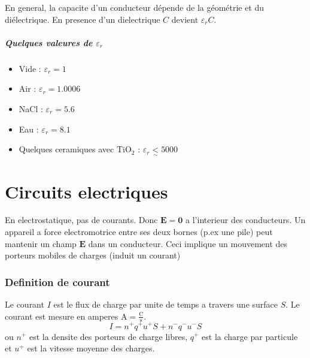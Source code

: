 En general, la capacite d'un conducteur dépende de la géométrie et du diélectrique.  En presence d'un dielectrique $C$ devient $\varepsilon _{r}C$.

\paragraph{Quelques valeures de $\varepsilon _{r}$}
\begin{itemize}
\item Vide : $\varepsilon _{r}=1$
\item Air : $\varepsilon _{r}=1.0006$
\item NaCl : $\varepsilon _{r}=5.6$
\item Eau : $\varepsilon _{r}=8.1$
\item Quelques ceramiques avec $\mathrm{TiO}_{2}$ : $\varepsilon _{r} \underset{\sim}< 5000$
\end{itemize}

\chapter{Circuits electriques}

En electrostatique, pas de courants. Donc $\boldsymbol{E}=\boldsymbol{0}$ a l'interieur des conducteurs. Un appareil a force electromotrice entre ses deux bornes (p.ex une pile) peut mantenir un champ $\boldsymbol{E}$ dans un conducteur. Ceci implique un mouvement des porteurs mobiles de charges (induit un courant)
\subsection{Definition de courant}
\begin{definition}
Le courant $I$ est le flux de charge par unite de temps a travers une surface $S$. Le courant est mesure en amperes $\mathrm{A}=\frac{\mathrm{C}}{\mathrm{s}}$. 
$$
I=n^{+}q^{+}u^{+}S+n^{-}q^{-}u^{-}S
$$
ou $n^{+}$ est la densite des porteurs de charge libres, $q^{+}$ est la charge par particule et $u^{+}$ est la vitesse moyenne des charges.
\end{definition}